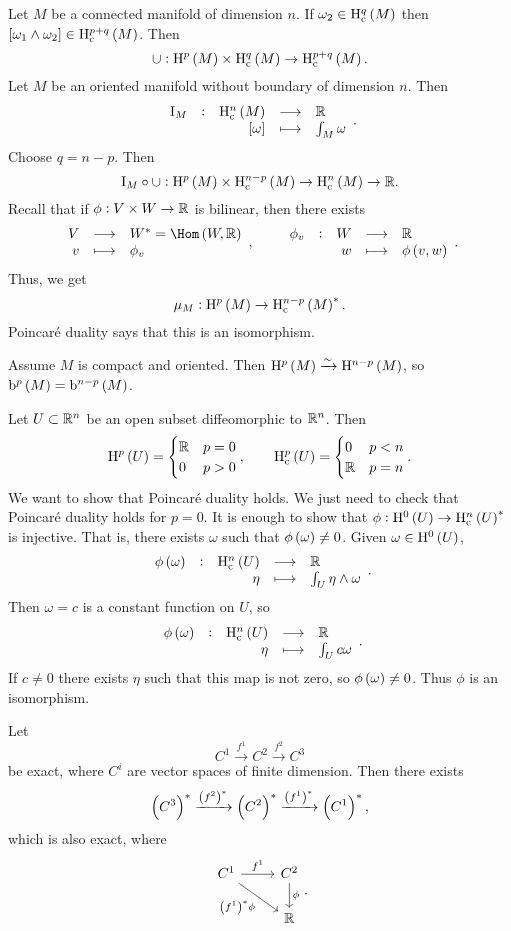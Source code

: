 
Let $ M $ be a connected manifold of dimension $ n $. If $ \omega_2 \in \H_\c^q\br{M} $ then $ \sbr{\omega_1 \wedge \omega_2} \in \H_\c^{p + q}\br{M} $. Then
$$ \cup : \H^p\br{M} \times \H_\c^q\br{M} \to \H_\c^{p + q}\br{M}. $$
Let $ M $ be an oriented manifold without boundary of dimension $ n $. Then
$$ \function[\I_M]{\H_\c^n\br{M}}{\RR}{\sbr{\omega}}{\int_M \omega}. $$
Choose $ q = n - p $. Then
$$ \I_M \circ \cup : \H^p\br{M} \times \H_\c^{n - p}\br{M} \to \H_\c^n\br{M} \to \RR. $$
Recall that if $ \phi : V \times W \to \mathbb{R} $ is bilinear, then there exists
$$ \function{V}{W^* = \Hom\br{W, \RR}}{v}{\phi_v}, \qquad \function[\phi_v]{W}{\RR}{w}{\phi\br{v, w}}. $$
Thus, we get
$$ \mu_M : \H^p\br{M} \to \H_\c^{n - p}\br{M}^*. $$
Poincar\'e duality says that this is an isomorphism.

\begin{example}
Assume $ M $ is compact and oriented. Then $ \H^p\br{M} \xrightarrow{\sim} \H^{n - p}\br{M} $, so $ \b^p\br{M} = \b^{n - p}\br{M} $.
\end{example}

\begin{example}
Let $ U \subset \mathbb{R}^n $ be an open subset diffeomorphic to $ \mathbb{R}^n $. Then
$$ \H^p\br{U} =
\begin{cases}
\RR & p = 0 \\
0 & p > 0
\end{cases},
\qquad \H_\c^p\br{U} =
\begin{cases}
0 & p < n \\
\RR & p = n
\end{cases}.
$$
We want to show that Poincar\'e duality holds. We just need to check that Poincar\'e duality holds for $ p = 0 $. It is enough to show that $ \phi : \H^0\br{U} \to \H_\c^n\br{U}^* $ is injective. That is, there exists $ \omega $ such that $ \phi\br{\omega} \ne 0 $. Given $ \omega \in \H^0\br{U} $,
$$ \function[\phi\br{\omega}]{\H_\c^n\br{U}}{\RR}{\eta}{\int_U \eta \wedge \omega}. $$
Then $ \omega = c $ is a constant function on $ U $, so
$$ \function[\phi\br{\omega}]{\H_\c^n\br{U}}{\RR}{\eta}{\int_U c\omega}. $$
If $ c \ne 0 $ there exists $ \eta $ such that this map is not zero, so $ \phi\br{\omega} \ne 0 $. Thus $ \phi $ is an isomorphism.
\end{example}

\pagebreak

\begin{lemma}
\label{lem:2.53}
Let
$$ C^1 \xrightarrow{f^1} C^2 \xrightarrow{f^2} C^3 $$
be exact, where $ C^i $ are vector spaces of finite dimension. Then there exists
$$ \br{C^3}^* \xrightarrow{\br{f^2}^*} \br{C^2}^* \xrightarrow{\br{f^1}^*} \br{C^1}^*, $$
which is also exact, where
$$
\begin{tikzcd}
C^1 \arrow{r}{f^1} \arrow[swap]{dr}{\br{f^1}^*\phi} & C^2 \arrow{d}{\phi} \\
& \RR
\end{tikzcd}.
$$
\end{lemma}

